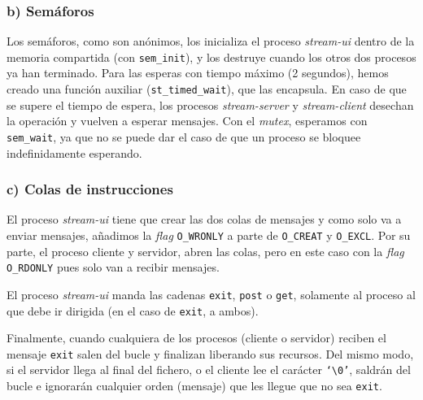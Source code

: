 \documentclass{article}
\begin{document}
\subsubsection*{b) Semáforos}
Los semáforos, como son anónimos, los inicializa el proceso \emph{stream-ui}
dentro de la memoria compartida (con \texttt{sem\_init}), y los destruye cuando los otros dos procesos ya han terminado. Para las esperas con tiempo máximo (2 segundos), hemos creado una función auxiliar (\texttt{st\_timed\_wait}), que las encapsula. En caso de que se supere el tiempo de espera, los procesos \textit{stream-server} y \textit{stream-client} desechan la operación y vuelven a esperar mensajes. Con el \emph{mutex}, esperamos con \texttt{sem\_wait}, ya que no se puede dar el caso de que un proceso se bloquee indefinidamente esperando. 


\subsubsection*{c) Colas de instrucciones}

El proceso \textit{stream-ui} tiene que crear las dos colas de mensajes y como solo va a enviar mensajes, añadimos la \textit{flag} \texttt{O\_WRONLY} a parte de  \texttt{O\_CREAT} y  \texttt{O\_EXCL}. Por su parte, el proceso cliente y servidor, abren las colas, pero en este caso con la \textit{flag} \texttt{O\_RDONLY} pues solo van a recibir mensajes.   

El proceso \emph{stream-ui} manda las cadenas \texttt{exit}, \texttt{post} o \texttt{get}, solamente al proceso al que debe ir dirigida (en el caso de \texttt{exit}, a ambos). 

Finalmente, cuando cualquiera de los procesos (cliente o servidor) reciben el mensaje \texttt{exit} salen del bucle y finalizan liberando sus recursos. Del mismo modo, si el servidor llega al final del fichero, o el cliente lee el carácter \texttt{`\textbackslash0'}, saldrán del bucle e ignorarán cualquier orden (mensaje) que les llegue que no sea \texttt{exit}.
\end{document}
